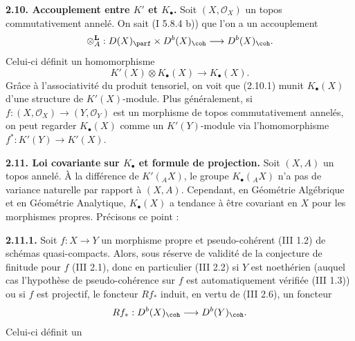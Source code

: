 \textbf{2.10. Accouplement entre \(K'\) et \(K_{\bullet}\).} Soit \((X,\mathcal O_X)\) un topos commutativement annelé. On sait (I 5.8.4 b)) que l'on a un accouplement
\[
 \otimes_A^{\mathbf L}:D(X)_{\parf}\times D^b(X)_{\coh}
 \longrightarrow D^b(X)_{\coh}.
\]
Celui-ci définit un homomorphisme
\begin{equation}\tag{2.10.1}
 K'(X)\otimes K_{\bullet}(X)\longrightarrow K_{\bullet}(X).
\end{equation}
Grâce à l'associativité du produit tensoriel, on voit que (2.10.1) munit \(K_{\bullet}(X)\) d'une structure de \(K'(X)\)-module. Plus généralement, si \(f:(X,\mathcal O_X)\longrightarrow(Y,\mathcal O_Y)\) est un morphisme de topos commutativement annelés, on peut regarder \(K_{\bullet}(X)\) comme un \(K'(Y)\)-module via l'homomorphisme \(f^*:K'(Y)\longrightarrow K'(X)\).

\textbf{2.11. Loi covariante sur \(K_{\bullet}\) et formule de projection.} Soit \((X,A)\) un topos annelé. À la différence de \(K'({}_A X)\), le groupe \(K_\bullet({}_A X)\) n'a pas de variance naturelle par rapport à \((X,A)\). Cependant, en Géométrie Algébrique et en Géométrie Analytique, \(K_{\bullet}(X)\) a tendance à être covariant en \(X\) pour les morphismes propres. Précisons ce point :

\textbf{2.11.1.} Soit \(f:X\to Y\) un morphisme propre et pseudo-cohérent (III 1.2) de schémas quasi-compacts. Alors, sous réserve de validité de la conjecture de finitude pour \(f\) (III 2.1), donc en particulier (III 2.2) si \(Y\) est noethérien (auquel cas l'hypothèse de pseudo-cohérence sur \(f\) est automatiquement vérifiée (III 1.3)) ou si \(f\) est projectif, le foncteur \(Rf_*\) induit, en vertu de (III 2.6), un foncteur
\[
 Rf_*:D^b(X)_{\coh}\longrightarrow D^b(Y)_{\coh}.
\]
Celui-ci définit un
